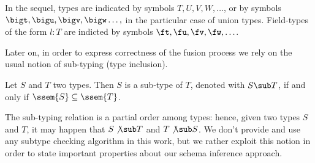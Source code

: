 In the sequel, types are indicated  by symbols $T, U, V, W, \ldots$, or  by symbols $\bigt, \bigu, \bigv, \bigw \ldots,$ in the particular case of union types. Field-types of the form $l:T$ are indicted by symbols  $\ft, \fu, \fv, \fw, \ldots$.

\medskip

Later on, in order to express correctness of the fusion process we rely on the usual  notion of sub-typing (type inclusion). 


\begin{definition}\label{ref:label}
Let $S$ and $T$ two types. Then $S$ is a sub-type of $T$, denoted with $S \sub T$, if and only if $\ssem{S} \subseteq \ssem{T}$.
\end{definition}

The sub-typing relation is a partial order among types: hence, given two types $S$ and $T$, it may happen that $S \not\sub T$ and $T \not\sub S$. We don't provide and use any subtype checking algorithm  in this work, but we rather exploit this notion in order to state important properties about our schema inference approach. 



